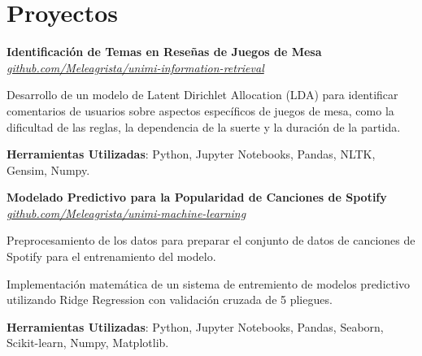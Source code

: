 \section{Proyectos}

\begin{onecolentry}
    \textbf{Identificación de Temas en Reseñas de Juegos de Mesa} \\
    \textit{\href{https://github.com/Meleagrista/unimi-information-retrieval}{github.com/Meleagrista/unimi-information-retrieval}}
\end{onecolentry}

\vspace{0.20 cm}
\begin{onecolentry}
    \begin{highlights}
        \item Desarrollo de un modelo de Latent Dirichlet Allocation (LDA) para identificar comentarios de usuarios sobre aspectos específicos de juegos de mesa, como la dificultad de las reglas, la dependencia de la suerte y la duración de la partida.
        \item \textbf{Herramientas Utilizadas}: Python, Jupyter Notebooks, Pandas, NLTK, Gensim, Numpy.
    \end{highlights}
\end{onecolentry}

\vspace{0.2 cm}

\begin{onecolentry}
    \textbf{Modelado Predictivo para la Popularidad de Canciones de Spotify} \\
    \textit{\href{https://github.com/Meleagrista/unimi-machine-learning}{github.com/Meleagrista/unimi-machine-learning}}
\end{onecolentry}

\vspace{0.20 cm}
\begin{onecolentry}
    \begin{highlights}        
        \item Preprocesamiento de los datos para preparar el conjunto de datos de canciones de Spotify para el entrenamiento del modelo.
        \item Implementación matemática de un sistema de entremiento de modelos predictivo utilizando Ridge Regression con validación cruzada de 5 pliegues.
        \item \textbf{Herramientas Utilizadas}: Python, Jupyter Notebooks, Pandas, Seaborn, Scikit-learn, Numpy, Matplotlib.
    \end{highlights}
\end{onecolentry}

